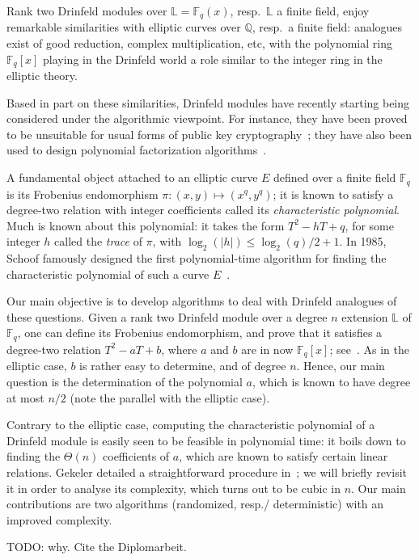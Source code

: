 \documentclass[sigconf]{acmart}
\newcommand{\Q}{\mathbb{Q}}
\newcommand{\F}{\mathbb{F}}
\renewcommand{\L}{\mathbb{L}}
\begin{document}
Rank two Drinfeld modules over $\L=\F_q(x)$, resp.\ $\L$ a finite
field, enjoy remarkable similarities with elliptic curves over $\Q$,
resp.\ a finite field: analogues exist of good reduction, complex
multiplication, etc, with the polynomial ring $\F_q[x]$ playing in the
Drinfeld world a role similar to the integer ring in the elliptic
theory.

Based in part on these similarities, Drinfeld modules have recently
starting being considered under the algorithmic viewpoint. For
instance, they have been proved to be unsuitable for usual forms of
public key cryptography~\cite{Scanlon01}; they have also been used to
design polynomial factorization
algorithms~\cite{xxx,yyy,NarayananXX,zzz}.

A fundamental object attached to an elliptic curve $E$ defined over a
finite field $\F_q$ is its Frobenius endomorphism $\pi:(x,y) \mapsto
(x^q,y^q)$; it is known to satisfy a degree-two relation with integer
coefficients called its {\em characteristic polynomial}. Much is known
about this polynomial: it takes the form $T^2 - h T + q$, for some
integer $h$ called the {\em trace} of $\pi$, with $\log_2(|h|) \le
\log_2(q)/2 + 1$. In 1985, Schoof famously designed the first
polynomial-time algorithm for finding the characteristic polynomial of
such a curve $E$~\cite{schoof85}.

Our main objective is to develop algorithms to deal with Drinfeld
analogues of these questions. Given a rank two Drinfeld module over a
degree $n$ extension $\L$ of $\F_q$, one can define its Frobenius
endomorphism, and prove that it satisfies a degree-two relation $T^2 -
a T + b$, where $a$ and $b$ are in now $\F_q[x]$; see~\cite{xxx}. As
in the elliptic case, $b$ is rather easy to determine, and of degree
$n$. Hence, our main question is the determination of the polynomial
$a$, which is known to have degree at most $n/2$ (note the parallel
with the elliptic case).

Contrary to the elliptic case, computing the characteristic polynomial
of a Drinfeld module is easily seen to be feasible in polynomial time:
it boils down to finding the $\Theta(n)$ coefficients of $a$, which
are known to satisfy certain linear relations. Gekeler detailed a
straightforward procedure in~\cite{xxx}; we will briefly revisit it in
order to analyse its complexity, which turns out to be cubic in $n$.
Our main contributions are two algorithms (randomized, resp./ deterministic)
with an improved complexity.

TODO: why. Cite the Diplomarbeit.
\end{document}
